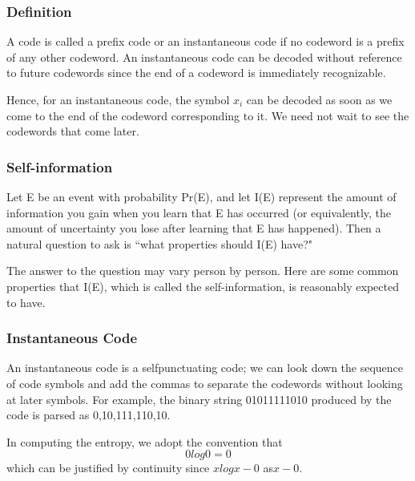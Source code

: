 \begin{frame}
\frametitle{Definition} A code is called a prefix code or an instantaneous code if
no codeword is a prefix of any other codeword.
An instantaneous code can be decoded without reference to future codewords
since the end of a codeword is immediately recognizable. 

Hence,
for an instantaneous code, the symbol $x_i$ can be decoded as soon as we
come to the end of the codeword corresponding to it. We need not wait
to see the codewords that come later. 
\end{frame}
\begin{frame}
\frametitle{Self-information}

Let E be an event with probability Pr(E), and let I(E) represent the amount
of information you gain when you learn that E has occurred (or equivalently,
the amount of uncertainty you lose after learning that E has happened). Then
a natural question to ask is ``what properties should I(E) have?" 

The answer
to the question may vary person by person. Here are some common properties
that I(E), which is called the self-information, is reasonably expected to have.

\end{frame}
\begin{frame}
\frametitle{Instantaneous Code}
An instantaneous code is a selfpunctuating
code; we can look down the sequence of code symbols and
add the commas to separate the codewords without looking at later symbols.
For example, the binary string 01011111010 produced by the code
is parsed as 0,10,111,110,10.
\end{frame}
\begin{frame}
In computing the entropy, we adopt the convention that
\[0  log 0 = 0\]
which can be justified by continuity since $x log x - 0$ as$ x - 0$.

\end{frame}


